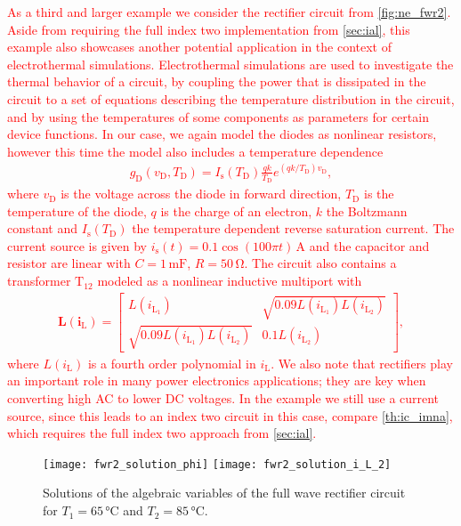 \documentclass[AMA,STIX1COL]{WileyNJD-v2}
\newcommand{\mb}[1]{\mathbf{#1}}
\newcommand{\mr}[1]{\mathrm{#1}}
\renewcommand{\i}[1]{\mb{i}_\mr{#1}}
\begin{document}
\textcolor{red}{As a third and larger example we consider the rectifier circuit from \autoref{fig:ne_fwr2}. Aside from requiring the full index two implementation from \autoref{sec:ial}, this example also showcases another potential application in the context of electrothermal simulations. Electrothermal simulations are used to investigate the thermal behavior of a circuit, by coupling the power that is dissipated in the circuit to a set of equations describing the temperature distribution in the circuit, and by using the temperatures of some components as parameters for certain device functions. In our case, we again model the diodes as nonlinear resistors, however this time the model also includes a temperature dependence\cite{tietze2008}
\begin{align*}
    g_\mr{D}(v_\mr{D}, T_\mr{D}) = I_\mr{s}(T_\mr{D}) \frac{qk}{T_\mr{D}} e^{(qk/T_\mr{D}) v_\mr{D}},
\end{align*}
where $v_\mr{D}$ is the voltage across the diode in forward direction, $T_\mr{D}$ is the temperature of the diode, $q$ is the charge of an electron, $k$ the Boltzmann constant and $I_\mr{s}(T_\mr{D})$ the temperature dependent reverse saturation current\cite{tietze2008}. The current source is given by $i_\mr{s}(t) = 0.1 \cos(100 \pi t)\, \si{\ampere}$ and the capacitor and resistor are linear with $C = 1\, \si{\milli\farad}$, $R = 50\, \si{\ohm}$. The circuit also contains a transformer $\mr{T}_{12}$ modeled as a nonlinear inductive multiport with
\begin{align*}
    \mb{L}(\i{L}) = \begin{bmatrix}
        L(i_{\mr{L}_1}) & \sqrt{0.09 L(i_{\mr{L}_1}) L(i_{\mr{L}_2})}\\
        \sqrt{0.09 L(i_{\mr{L}_1}) L(i_{\mr{L}_2})} & 0.1 L(i_{\mr{L}_2})
    \end{bmatrix},
\end{align*}
where $L(i_\mr{L})$ is a fourth order polynomial in $i_\mr{L}$\cite{lullo2017}. We also note that rectifiers play an important role in many power electronics applications; they are key when converting high AC to lower DC voltages. In the example we still use a current source, since this leads to an index two circuit in this case, compare \autoref{th:ic_imna}, which requires the full index two approach from \autoref{sec:ial}.}
\begin{figure}[t]
    \begin{center}
        \texttt{[image: fwr2\_solution\_phi]} \hspace{1.5cm} \texttt{[image: fwr2\_solution\_i\_L\_2]}
    \end{center}
    \caption{Solutions of the algebraic variables of the full wave rectifier circuit for $T_1 = 65\, \si{\celsius}$ and $T_2 = 85\, \si{\celsius}$.}
    \label{fig:ne_fwr2_solution_a}
\end{figure}
\end{document}
